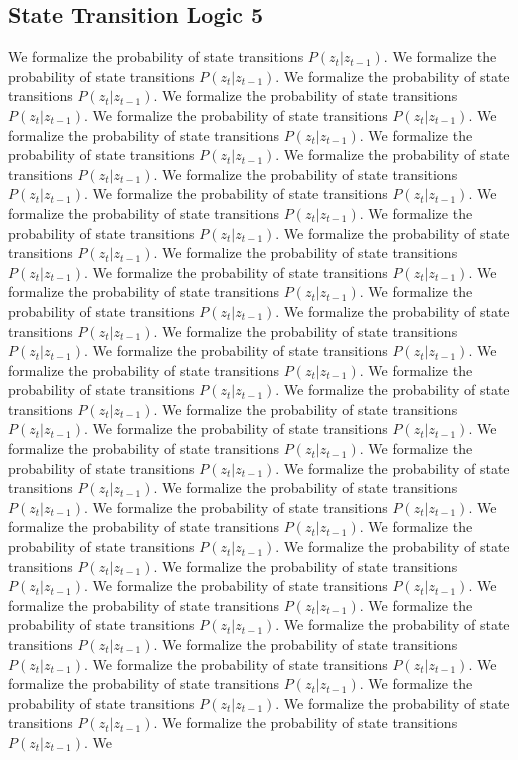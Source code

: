 \subsection{State Transition Logic 5}
We formalize the probability of state transitions $P(z_t | z_{t-1})$. We formalize the probability of state transitions $P(z_t | z_{t-1})$. We formalize the probability of state transitions $P(z_t | z_{t-1})$. We formalize the probability of state transitions $P(z_t | z_{t-1})$. We formalize the probability of state transitions $P(z_t | z_{t-1})$. We formalize the probability of state transitions $P(z_t | z_{t-1})$. We formalize the probability of state transitions $P(z_t | z_{t-1})$. We formalize the probability of state transitions $P(z_t | z_{t-1})$. We formalize the probability of state transitions $P(z_t | z_{t-1})$. We formalize the probability of state transitions $P(z_t | z_{t-1})$. We formalize the probability of state transitions $P(z_t | z_{t-1})$. We formalize the probability of state transitions $P(z_t | z_{t-1})$. We formalize the probability of state transitions $P(z_t | z_{t-1})$. We formalize the probability of state transitions $P(z_t | z_{t-1})$. We formalize the probability of state transitions $P(z_t | z_{t-1})$. We formalize the probability of state transitions $P(z_t | z_{t-1})$. We formalize the probability of state transitions $P(z_t | z_{t-1})$. We formalize the probability of state transitions $P(z_t | z_{t-1})$. We formalize the probability of state transitions $P(z_t | z_{t-1})$. We formalize the probability of state transitions $P(z_t | z_{t-1})$. We formalize the probability of state transitions $P(z_t | z_{t-1})$. We formalize the probability of state transitions $P(z_t | z_{t-1})$. We formalize the probability of state transitions $P(z_t | z_{t-1})$. We formalize the probability of state transitions $P(z_t | z_{t-1})$. We formalize the probability of state transitions $P(z_t | z_{t-1})$. We formalize the probability of state transitions $P(z_t | z_{t-1})$. We formalize the probability of state transitions $P(z_t | z_{t-1})$. We formalize the probability of state transitions $P(z_t | z_{t-1})$. We formalize the probability of state transitions $P(z_t | z_{t-1})$. We formalize the probability of state transitions $P(z_t | z_{t-1})$. We formalize the probability of state transitions $P(z_t | z_{t-1})$. We formalize the probability of state transitions $P(z_t | z_{t-1})$. We formalize the probability of state transitions $P(z_t | z_{t-1})$. We formalize the probability of state transitions $P(z_t | z_{t-1})$. We formalize the probability of state transitions $P(z_t | z_{t-1})$. We formalize the probability of state transitions $P(z_t | z_{t-1})$. We formalize the probability of state transitions $P(z_t | z_{t-1})$. We formalize the probability of state transitions $P(z_t | z_{t-1})$. We formalize the probability of state transitions $P(z_t | z_{t-1})$. We formalize the probability of state transitions $P(z_t | z_{t-1})$. We formalize the probability of state transitions $P(z_t | z_{t-1})$. We formalize the probability of state transitions $P(z_t | z_{t-1})$. We formalize the probability of state transitions $P(z_t | z_{t-1})$. We formalize the probability of state transitions $P(z_t | z_{t-1})$. We 